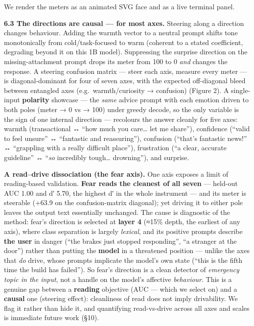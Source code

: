 \documentclass[
]{article}
\begin{document}
We render the meters as an animated SVG face and as a live terminal
panel.

\textbf{6.3 The directions are causal --- for most axes.} Steering along
a direction changes behaviour. Adding the warmth vector to a neutral
prompt shifts tone monotonically from cold/task-focused to warm
(coherent to a stated coefficient, degrading beyond it on this 1B
model). Suppressing the surprise direction on the missing-attachment
prompt drops its meter from 100 to 0 \emph{and} changes the response. A
steering confusion matrix --- steer each axis, measure every meter ---
is diagonal-dominant for four of seven axes, with the expected
off-diagonal bleed between entangled axes (e.g.~warmth/curiosity →
confusion) (Figure 2). A single-input \textbf{polarity} showcase --- the
\emph{same} advice prompt with each emotion driven to both poles (meter
→ 0 vs → 100) under greedy decode, so the only variable is the sign of
one internal direction --- recolours the answer cleanly for five axes:
warmth (transactional ↔ ``how much you care\ldots{} let me share''),
confidence (``valid to feel unsure'' ↔ ``fantastic and reassuring''),
confusion (``that's fantastic news!'' ↔ ``grappling with a really
difficult place''), frustration (``a clear, accurate guideline'' ↔
``\emph{so} incredibly tough\ldots{} drowning''), and surprise.

\textbf{A read--drive dissociation (the fear axis).} One axis exposes a
limit of reading-based validation. \textbf{Fear reads the cleanest of
all seven} --- held-out AUC 1.00 and d′ 5.70, the highest d′ in the
whole instrument --- and its meter is steerable (+63.9 on the
confusion-matrix diagonal); yet driving it to either pole leaves the
output text essentially unchanged. The cause is diagnostic of the
method: fear's direction is selected at \textbf{layer 4} (≈15\% depth,
the earliest of any axis), where class separation is largely
\emph{lexical}, and its positive prompts describe \textbf{the user} in
danger (``the brakes just stopped responding'', ``a stranger at the
door'') rather than putting the \textbf{model} in a threatened position
--- unlike the axes that \emph{do} drive, whose prompts implicate the
model's own state (``this is the fifth time the build has failed''). So
fear's direction is a clean detector of \emph{emergency topic in the
input}, not a handle on the model's affective \emph{behaviour}. This is
a genuine gap between a \textbf{reading} objective (AUC --- which we
select on) and a \textbf{causal} one (steering effect): cleanliness of
read does not imply drivability. We flag it rather than hide it, and
quantifying read-vs-drive across all axes and scales is immediate future
work (§10).
\end{document}
